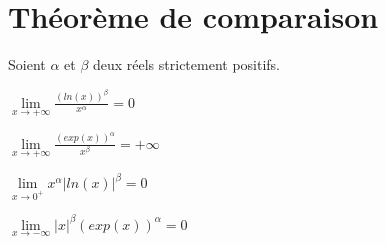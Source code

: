 \documentclass[12pt,twoside,a4paper]{article}
\begin{document}
	\section{Th\'eor\`eme de comparaison}
		\begin{prop}
			Soient $\alpha$ et $\beta$ deux r\'eels strictement positifs.
			\begin{liste}
				\item $\lim\limits_{x\rightarrow+\infty}\frac{\left(ln(x)\right)^\beta}{x^\alpha}=0$
				\item $\lim\limits_{x\rightarrow+\infty}\frac{\left(exp(x)\right)^\alpha}{x^\beta}=+\infty$
				\item $\lim\limits_{x\rightarrow0^+}x^\alpha\left|ln(x)\right|^\beta=0$
				\item $\lim\limits_{x\rightarrow-\infty}|x|^\beta \left(exp(x)\right)^\alpha=0$
			\end{liste}
		\end{prop}
\end{document}
